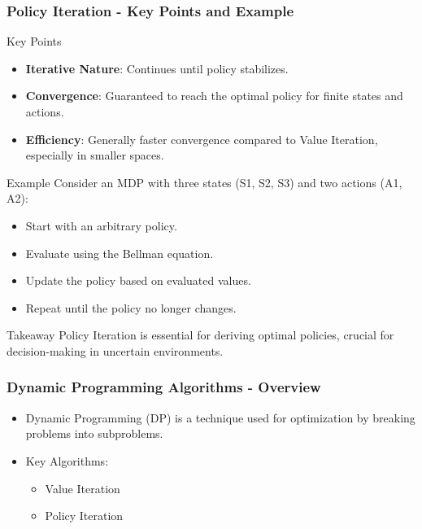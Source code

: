 \documentclass[aspectratio=169]{beamer}
\begin{document}
\begin{frame}[fragile]
    \frametitle{Policy Iteration - Key Points and Example}
    \begin{block}{Key Points}
        \begin{itemize}
            \item \textbf{Iterative Nature}: Continues until policy stabilizes.
            \item \textbf{Convergence}: Guaranteed to reach the optimal policy for finite states and actions.
            \item \textbf{Efficiency}: Generally faster convergence compared to Value Iteration, especially in smaller spaces.
        \end{itemize}
    \end{block}

    \begin{block}{Example}
        Consider an MDP with three states (S1, S2, S3) and two actions (A1, A2):
        \begin{itemize}
            \item Start with an arbitrary policy.
            \item Evaluate using the Bellman equation.
            \item Update the policy based on evaluated values.
            \item Repeat until the policy no longer changes.
        \end{itemize}
    \end{block}
    
    \begin{block}{Takeaway}
        Policy Iteration is essential for deriving optimal policies, crucial for decision-making in uncertain environments.
    \end{block}
\end{frame}

\begin{frame}[fragile]
  \frametitle{Dynamic Programming Algorithms - Overview}
  \begin{itemize}
    \item Dynamic Programming (DP) is a technique used for optimization by breaking problems into subproblems.
    \item Key Algorithms:
    \begin{itemize}
      \item Value Iteration
      \item Policy Iteration
    \end{itemize}
  \end{itemize}
\end{frame}
\end{document}
